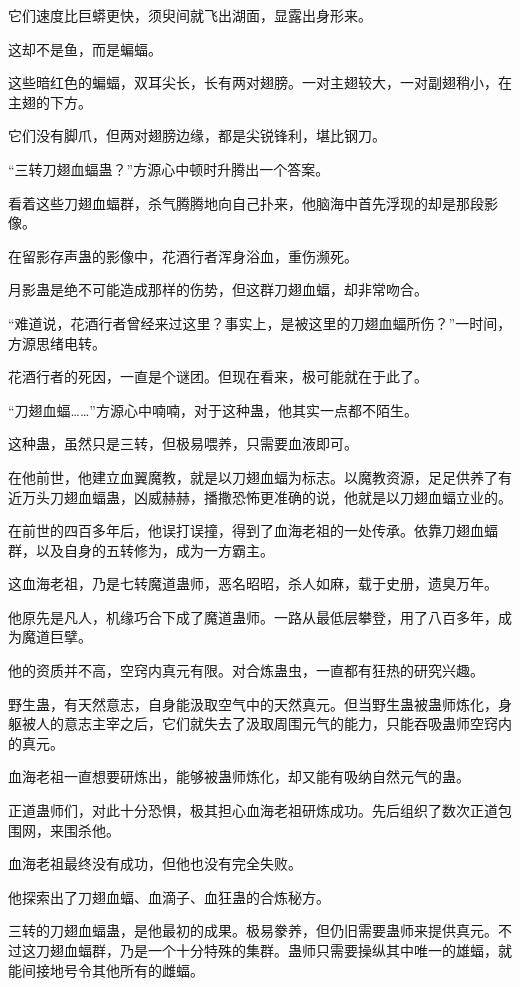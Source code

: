 \begin{this_body}
它们速度比巨蟒更快，须臾间就飞出湖面，显露出身形来。

这却不是鱼，而是蝙蝠。

这些暗红色的蝙蝠，双耳尖长，长有两对翅膀。一对主翅较大，一对副翅稍小，在主翅的下方。

它们没有脚爪，但两对翅膀边缘，都是尖锐锋利，堪比钢刀。

“三转刀翅血蝠蛊？”方源心中顿时升腾出一个答案。

看着这些刀翅血蝠群，杀气腾腾地向自己扑来，他脑海中首先浮现的却是那段影像。

在留影存声蛊的影像中，花酒行者浑身浴血，重伤濒死。

月影蛊是绝不可能造成那样的伤势，但这群刀翅血蝠，却非常吻合。

“难道说，花酒行者曾经来过这里？事实上，是被这里的刀翅血蝠所伤？”一时间，方源思绪电转。

花酒行者的死因，一直是个谜团。但现在看来，极可能就在于此了。

“刀翅血蝠……”方源心中喃喃，对于这种蛊，他其实一点都不陌生。

这种蛊，虽然只是三转，但极易喂养，只需要血液即可。

在他前世，他建立血翼魔教，就是以刀翅血蝠为标志。以魔教资源，足足供养了有近万头刀翅血蝠蛊，凶威赫赫，播撒恐怖更准确的说，他就是以刀翅血蝠立业的。

在前世的四百多年后，他误打误撞，得到了血海老祖的一处传承。依靠刀翅血蝠群，以及自身的五转修为，成为一方霸主。

这血海老祖，乃是七转魔道蛊师，恶名昭昭，杀人如麻，载于史册，遗臭万年。

他原先是凡人，机缘巧合下成了魔道蛊师。一路从最低层攀登，用了八百多年，成为魔道巨擘。

他的资质并不高，空窍内真元有限。对合炼蛊虫，一直都有狂热的研究兴趣。

野生蛊，有天然意志，自身能汲取空气中的天然真元。但当野生蛊被蛊师炼化，身躯被人的意志主宰之后，它们就失去了汲取周围元气的能力，只能吞吸蛊师空窍内的真元。

血海老祖一直想要研炼出，能够被蛊师炼化，却又能有吸纳自然元气的蛊。

正道蛊师们，对此十分恐惧，极其担心血海老祖研炼成功。先后组织了数次正道包围网，来围杀他。

血海老祖最终没有成功，但他也没有完全失败。

他探索出了刀翅血蝠、血滴子、血狂蛊的合炼秘方。

三转的刀翅血蝠蛊，是他最初的成果。极易豢养，但仍旧需要蛊师来提供真元。不过这刀翅血蝠群，乃是一个十分特殊的集群。蛊师只需要操纵其中唯一的雄蝠，就能间接地号令其他所有的雌蝠。


\end{this_body}
